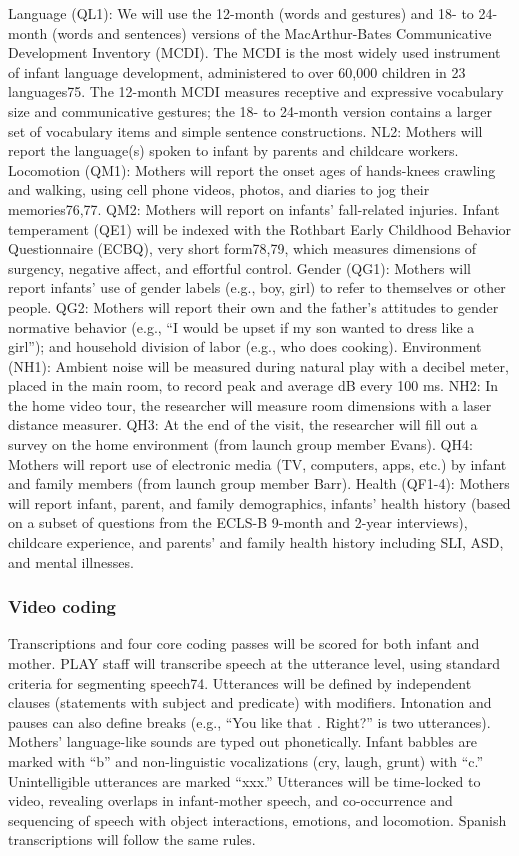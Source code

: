 \documentclass[english,man]{apa6}
\theoremstyle{definition}
\theoremstyle{definition}
\theoremstyle{definition}
\theoremstyle{remark}
\begin{document}
Language (QL1): We will use the 12-month (words and gestures) and 18- to
24-month (words and sentences) versions of the MacArthur-Bates
Communicative Development Inventory (MCDI). The MCDI is the most widely
used instrument of infant language development, administered to over
60,000 children in 23 languages75. The 12-month MCDI measures receptive
and expressive vocabulary size and communicative gestures; the 18- to
24-month version contains a larger set of vocabulary items and simple
sentence constructions. NL2: Mothers will report the language(s) spoken
to infant by parents and childcare workers. Locomotion (QM1): Mothers
will report the onset ages of hands-knees crawling and walking, using
cell phone videos, photos, and diaries to jog their memories76,77. QM2:
Mothers will report on infants' fall-related injuries. Infant
temperament (QE1) will be indexed with the Rothbart Early Childhood
Behavior Questionnaire (ECBQ), very short form78,79, which measures
dimensions of surgency, negative affect, and effortful control. Gender
(QG1): Mothers will report infants' use of gender labels (e.g., boy,
girl) to refer to themselves or other people. QG2: Mothers will report
their own and the father's attitudes to gender normative behavior (e.g.,
\enquote{I would be upset if my son wanted to dress like a girl}); and
household division of labor (e.g., who does cooking). Environment (NH1):
Ambient noise will be measured during natural play with a decibel meter,
placed in the main room, to record peak and average dB every 100 ms.
NH2: In the home video tour, the researcher will measure room dimensions
with a laser distance measurer. QH3: At the end of the visit, the
researcher will fill out a survey on the home environment (from launch
group member Evans). QH4: Mothers will report use of electronic media
(TV, computers, apps, etc.) by infant and family members (from launch
group member Barr). Health (QF1-4): Mothers will report infant, parent,
and family demographics, infants' health history (based on a subset of
questions from the ECLS-B 9-month and 2-year interviews), childcare
experience, and parents' and family health history including SLI, ASD,
and mental illnesses.

\subsubsection{Video coding}\label{video-coding-1}

Transcriptions and four core coding passes will be scored for both
infant and mother. PLAY staff will transcribe speech at the utterance
level, using standard criteria for segmenting speech74. Utterances will
be defined by independent clauses (statements with subject and
predicate) with modifiers. Intonation and pauses can also define breaks
(e.g., \enquote{You like that . Right?} is two utterances). Mothers'
language-like sounds are typed out phonetically. Infant babbles are
marked with \enquote{b} and non-linguistic vocalizations (cry, laugh,
grunt) with \enquote{c.} Unintelligible utterances are marked
\enquote{xxx.} Utterances will be time-locked to video, revealing
overlaps in infant-mother speech, and co-occurrence and sequencing of
speech with object interactions, emotions, and locomotion. Spanish
transcriptions will follow the same rules.
\end{document}
